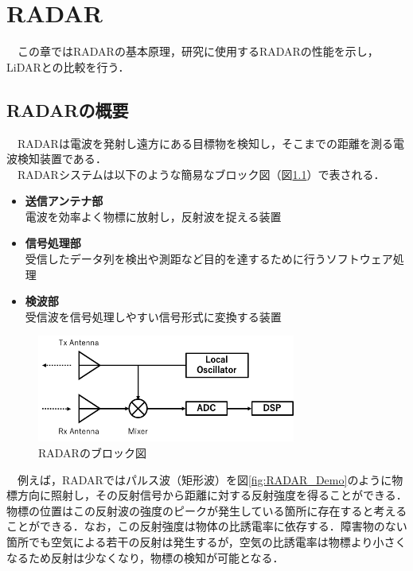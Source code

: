 \chapter{RADAR}
　この章ではRADARの基本原理，研究に使用するRADARの性能を示し，LiDARとの比較を行う．

\section{RADARの概要}
　RADARは電波を発射し遠方にある目標物を検知し，そこまでの距離を測る電波検知装置である\cite{RADAR_book}．\\
　RADARシステムは以下のような簡易なブロック図（図\ref{fig:RADAR_Block}）で表される．

\begin{itemize}
    \item \textbf{送信アンテナ部}\\
        電波を効率よく物標に放射し，反射波を捉える装置
    \item \textbf{信号処理部}\\
        受信したデータ列を検出や測距など目的を達するために行うソフトウェア処理
    \item \textbf{検波部}\\
        受信波を信号処理しやすい信号形式に変換する装置
\end{itemize}

\begin{figure}[H]
    \centering
    \includegraphics[width=8.5cm]{./fig/RADAR_Block.png}
    \caption{RADARのブロック図}
    \label{fig:RADAR_Block}
\end{figure}

　例えば，RADARではパルス波（矩形波）を図\ref{fig:RADAR_Demo}のように物標方向に照射し，その反射信号から距離に対する反射強度を得ることができる．物標の位置はこの反射波の強度のピークが発生している箇所に存在すると考えることができる．なお，この反射強度は物体の比誘電率に依存する．障害物のない箇所でも空気による若干の反射は発生するが，空気の比誘電率は物標より小さくなるため反射は少なくなり，物標の検知が可能となる．

